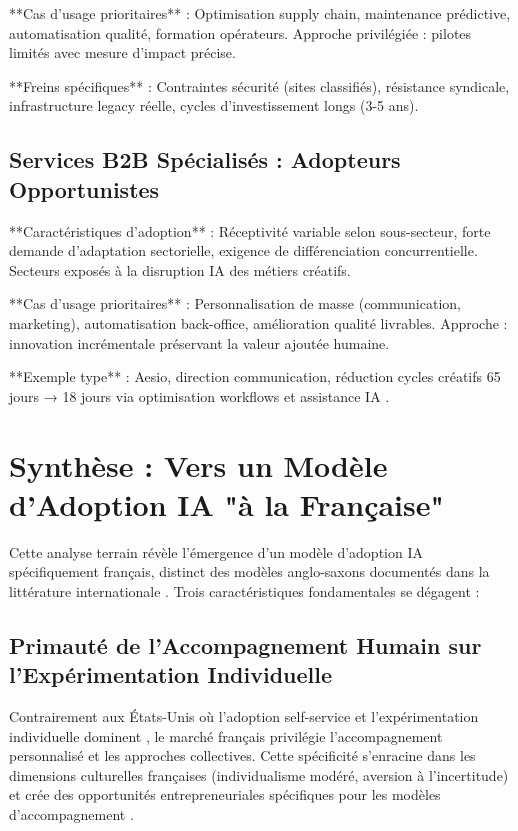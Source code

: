 **Cas d'usage prioritaires** : Optimisation supply chain, maintenance prédictive, automatisation qualité, formation opérateurs. Approche privilégiée : pilotes limités avec mesure d'impact précise.

**Freins spécifiques** : Contraintes sécurité (sites classifiés), résistance syndicale, infrastructure legacy réelle, cycles d'investissement longs (3-5 ans).

\subsection{Services B2B Spécialisés : Adopteurs Opportunistes}

**Caractéristiques d'adoption** : Réceptivité variable selon sous-secteur, forte demande d'adaptation sectorielle, exigence de différenciation concurrentielle. Secteurs exposés à la disruption IA des métiers créatifs.

**Cas d'usage prioritaires** : Personnalisation de masse (communication, marketing), automatisation back-office, amélioration qualité livrables. Approche : innovation incrémentale préservant la valeur ajoutée humaine.

**Exemple type** : Aesio, direction communication, réduction cycles créatifs 65 jours → 18 jours via optimisation workflows et assistance IA \cite{luwai2025aesio}.

\section{Synthèse : Vers un Modèle d'Adoption IA "à la Française"}

Cette analyse terrain révèle l'émergence d'un modèle d'adoption IA spécifiquement français, distinct des modèles anglo-saxons documentés dans la littérature internationale \cite{rogers2003diffusion,moore2014crossing}. Trois caractéristiques fondamentales se dégagent :

\subsection{Primauté de l'Accompagnement Humain sur l'Expérimentation Individuelle}

Contrairement aux États-Unis où l'adoption self-service et l'expérimentation individuelle dominent \cite{mit2024ai_adoption}, le marché français privilégie l'accompagnement personnalisé et les approches collectives. Cette spécificité s'enracine dans les dimensions culturelles françaises (individualisme modéré, aversion à l'incertitude) et crée des opportunités entrepreneuriales spécifiques pour les modèles d'accompagnement \cite{hofstede2001culture}.

